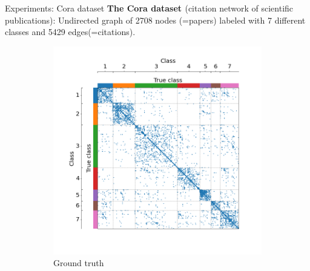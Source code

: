 \documentclass[final]{beamer}
\newlength{\colwidth}
\begin{document}
\begin{frame}[t]
\begin{columns}[t]
\begin{column}{\colwidth}
      \begin{block}{Experiments: Cora dataset}
        \textbf{The Cora dataset \cite{cora}} (citation network of scientific publications): Undirected graph of 2708 nodes (=papers) labeled with 7 different classes and 5429 edges(=citations).
        \begin{figure}[H]
          \centering
          \hfill
          \begin{subfigure}{0.36\linewidth}
            \centering
            \includegraphics[width=\linewidth, trim={45 25 35 40}, clip]{figures/cora_gt.png}
            \caption{Ground truth
            }
            \label{fig:cora_gt}
          \end{subfigure}
          \hspace{1em}
          \begin{subfigure}{0.36\linewidth}
            \centering

\end{subfigure}
\end{figure}
\end{block}
\end{column}
\end{columns}
\end{frame}
\end{document}
